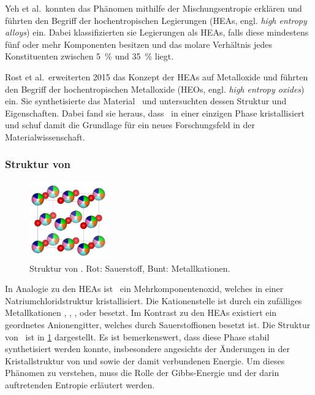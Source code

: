 Yeh et al.\ konnten das Phänomen mithilfe der Mischungsentropie erklären und führten den Begriff der
hochentropischen Legierungen (HEAs, engl. \textit{high entropy alloys}) ein.
Dabei klassifizierten sie Legierungen als HEAs, falls diese mindestens fünf oder mehr Komponenten besitzen
und das molare Verhältnis jedes Konstituenten zwischen \qty{5}{\percent} und \qty{35}{\percent} liegt.\autocite{yeh}

Rost et al.\ erweiterten 2015 das Konzept der HEAs auf Metalloxide und führten den Begriff der hochentropischen
Metalloxide (HEOs, engl. \textit{high entropy oxides}) ein.
Sie synthetisierte das Material \heo\ und untersuchten dessen Struktur und Eigenschaften.
Dabei fand sie heraus, dass \heo\ in einer einzigen Phase kristallisiert und
schuf damit die Grundlage für ein neues Forschungsfeld in der Materialwissenschaft.\autocite{Rost2015}

\subsubsection{Struktur von \heo}
\begin{figure}
    \centering
    \includegraphics[width=0.3\textwidth]{../assets/theorie/heo}
    \caption{Struktur von \heo. Rot: Sauerstoff, Bunt: Metallkationen.}
    \label{fig:heo}
\end{figure}
In Analogie zu den HEAs ist \heo\ ein Mehrkomponentenoxid, welches in einer Natriumchloridstruktur kristallisiert.
Die Kationenstelle ist durch ein zufälliges Metallkationen , , ,
 oder  besetzt.
Im Kontrast zu den HEAs existiert ein geordnetes Anionengitter, welches durch Sauerstoffionen besetzt ist.
Die Struktur von \heo\ ist in \cref{fig:heo} dargestellt.\autocite[5]{Rost2015}
Es ist bemerkenswert, dass diese Phase stabil synthetisiert werden konnte, insbesondere angesichts der Änderungen in der
Kristallstruktur von  und  sowie der damit verbundenen Energie.
Um dieses Phänomen zu verstehen, muss die Rolle der Gibbs-Energie und der darin auftretenden Entropie
erläutert werden.

